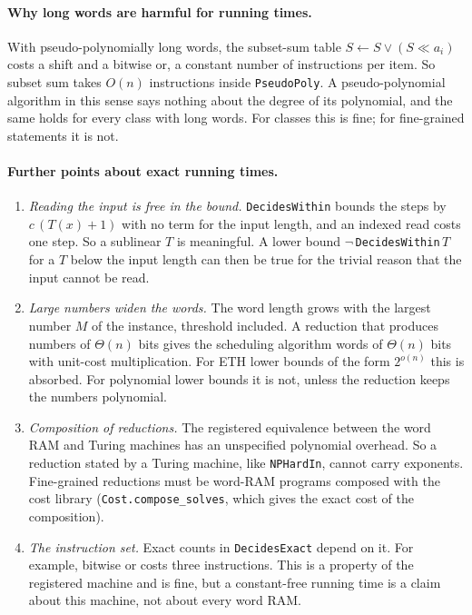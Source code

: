\documentclass[11pt]{article}
\newcommand{\lean}[1]{\texttt{#1}}
\theoremstyle{definition}
\begin{document}
\paragraph{Why long words are harmful for running times.} With
pseudo-polynomially long words, the subset-sum table
$S \leftarrow S \lor (S \ll a_i)$ costs a shift and a bitwise or, a constant
number of instructions per item. So subset sum
takes $O(n)$ instructions inside \lean{PseudoPoly}. A pseudo-polynomial
algorithm in this sense says nothing about the degree of its polynomial, and
the same holds for every class with long words. For classes this is fine; for
fine-grained statements it is not.

\paragraph{Further points about exact running times.}
\begin{enumerate}[leftmargin=*]
\item \emph{Reading the input is free in the bound.} \lean{DecidesWithin}
bounds the steps by $c\,(T(x)+1)$ with no term for the input length, and an
indexed read costs one step. So a sublinear $T$ is meaningful. A lower bound
$\lnot\,$\lean{DecidesWithin}$\,T$ for a $T$ below the input length can then be
true for the trivial reason that the input cannot be read.
\item \emph{Large numbers widen the words.} The word length grows with the
largest number $M$ of the instance, threshold included. A reduction that
produces numbers of $\Theta(n)$ bits gives the scheduling algorithm words of
$\Theta(n)$ bits with unit-cost multiplication. For ETH lower bounds of the
form $2^{o(n)}$ this is absorbed. For polynomial lower bounds it is not,
unless the reduction keeps the numbers polynomial.
\item \emph{Composition of reductions.} The registered equivalence between
the word RAM and Turing machines has an unspecified polynomial overhead. So a
reduction stated by a Turing machine, like \lean{NPHardIn}, cannot carry
exponents. Fine-grained reductions must be word-RAM programs composed with
the cost library (\lean{Cost.compose\_solves}, which gives the exact cost of
the composition).
\item \emph{The instruction set.} Exact counts in \lean{DecidesExact} depend on
it. For example, bitwise or costs three instructions. This is a property of
the registered machine and is fine, but a constant-free running time is a
claim about this machine, not about every word RAM.
\end{enumerate}
\end{document}
